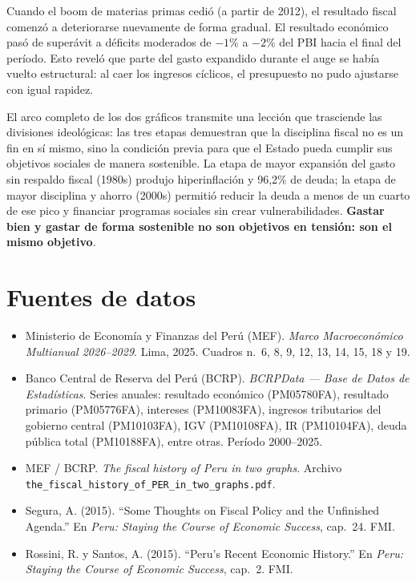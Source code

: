 \documentclass[12pt, a4paper]{article}
\newcommand{\emp}[1]{\textbf{#1}}
\begin{document}
Cuando el boom de materias primas cedió (a partir de 2012), el resultado
fiscal comenzó a deteriorarse nuevamente de forma gradual. El resultado
económico pasó de superávit a déficits moderados de $-1\%$ a $-2\%$ del PBI
hacia el final del período. Esto reveló que parte del gasto expandido durante
el auge se había vuelto estructural: al caer los ingresos cíclicos, el
presupuesto no pudo ajustarse con igual rapidez.

\begin{tcolorbox}[title={Síntesis para Tito Marx}]
El arco completo de los dos gráficos transmite una lección que trasciende las
divisiones ideológicas: las tres etapas demuestran que la disciplina fiscal
no es un fin en sí mismo, sino la condición previa para que el Estado pueda
cumplir sus objetivos sociales de manera sostenible. La etapa de mayor
expansión del gasto sin respaldo fiscal (1980s) produjo hiperinflación y
96{,}2\% de deuda; la etapa de mayor disciplina y ahorro (2000s) permitió
reducir la deuda a menos de un cuarto de ese pico y financiar programas
sociales sin crear vulnerabilidades. \emp{Gastar bien y gastar de forma
sostenible no son objetivos en tensión: son el mismo objetivo}.
\end{tcolorbox}

\section*{Fuentes de datos}

\begin{itemize}[leftmargin=1.5em]
    \item Ministerio de Economía y Finanzas del Perú (MEF). \textit{Marco
          Macroeconómico Multianual 2026--2029}. Lima, 2025. Cuadros n.\textordmasculine~6,
          8, 9, 12, 13, 14, 15, 18 y 19.
    \item Banco Central de Reserva del Perú (BCRP). \textit{BCRPData ---
          Base de Datos de Estadísticas}. Series anuales: resultado económico
          (PM05780FA), resultado primario (PM05776FA), intereses (PM10083FA),
          ingresos tributarios del gobierno central (PM10103FA), IGV
          (PM10108FA), IR (PM10104FA), deuda pública total (PM10188FA), entre
          otras. Período 2000--2025.
    \item MEF / BCRP. \textit{The fiscal history of Peru in two graphs}.
          Archivo \texttt{the\_fiscal\_history\_of\_PER\_in\_two\_graphs.pdf}.
    \item Segura, A. (2015). ``Some Thoughts on Fiscal Policy and the
          Unfinished Agenda.'' En \textit{Peru: Staying the Course of Economic
          Success}, cap.~24. FMI.
    \item Rossini, R. y Santos, A. (2015). ``Peru's Recent Economic History.''
          En \textit{Peru: Staying the Course of Economic
          Success}, cap.~2. FMI.
\end{itemize}
\end{document}
